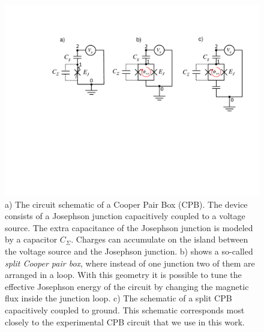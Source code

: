 \begin{figure}
	\centering
	\includegraphics[width=\textwidth]{"./material/figures/introduction/cooper_pair_box"}
	\caption{a) The circuit schematic of a Cooper Pair Box (CPB). The device consists of a Josephson junction capacitively coupled to a voltage source. The extra capacitance of the Josephson junction is modeled by a capacitor $C_\Sigma$. Charges can accumulate on the island between the voltage source and the Josephson junction. b) shows a so-called {\it split Cooper pair box}, where instead of one junction two of them are arranged in a loop. With this geometry it is possible to tune the effective Josephson energy of the circuit by changing the magnetic flux inside the junction loop. c) The schematic of a split CPB capacitively coupled to ground. This schematic corresponds most closely to the experimental CPB circuit that we use in this work.}
	\label{fig:cpb_circuit}
\end{figure}

